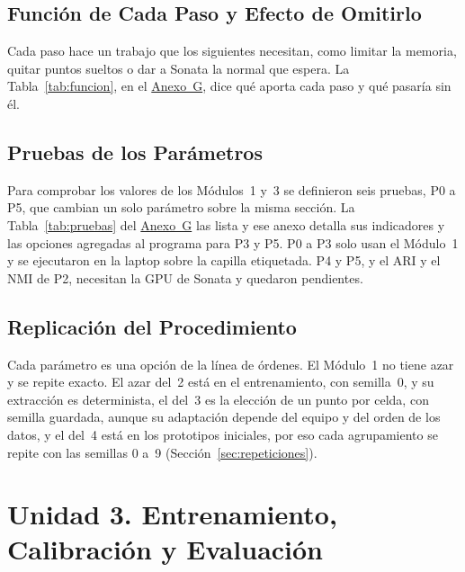 \subsection{Función de Cada Paso y Efecto de Omitirlo}
\label{sec:param-funcion}

Cada paso hace un trabajo que los siguientes necesitan, como limitar la memoria,
quitar puntos sueltos o dar a Sonata la normal que espera. La
Tabla~\ref{tab:funcion}, en el \hyperref[sec:anexo-parametros]{Anexo~G}, dice qué
aporta cada paso y qué pasaría sin él.

\subsection{Pruebas de los Parámetros}
\label{sec:param-criterio}

Para comprobar los valores de los Módulos~1 y~3 se definieron seis pruebas, P0 a
P5, que cambian un solo parámetro sobre la misma sección. La Tabla~\ref{tab:pruebas} del
\hyperref[sec:anexo-parametros]{Anexo~G} las lista y ese anexo detalla sus indicadores
y las opciones agregadas al programa para P3 y P5. P0 a P3 solo usan el Módulo~1 y se
ejecutaron en la laptop sobre la capilla etiquetada. P4 y P5, y el ARI y el NMI de
P2, necesitan la GPU de Sonata y quedaron pendientes.

\subsection{Replicación del Procedimiento}
\label{sec:param-replicacion}

Cada parámetro es una opción de la línea de órdenes. El Módulo~1 no tiene azar y se
repite exacto. El azar del~2 está en el entrenamiento, con semilla~0, y su extracción
es determinista, el del~3 es la elección de un punto por celda, con semilla guardada,
aunque su adaptación depende del equipo y del orden de los datos, y el del~4 está en
los prototipos iniciales, por eso cada agrupamiento se repite con las semillas 0 a~9
(Sección~\ref{sec:repeticiones}).

\section{Unidad 3. Entrenamiento, Calibración y Evaluación}
\label{sec:unidad3}

